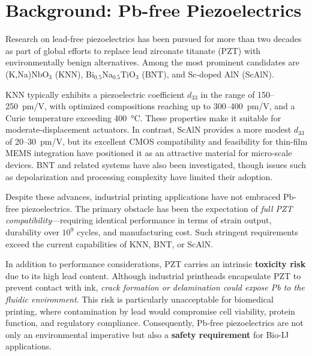 \section{Background: Pb-free Piezoelectrics}
Research on lead-free piezoelectrics has been pursued for more than two
decades as part of global efforts to replace lead zirconate titanate
(PZT) with environmentally benign alternatives.
Among the most prominent candidates are (K,Na)NbO$_3$ (KNN),
Bi$_{0.5}$Na$_{0.5}$TiO$_3$ (BNT), and Sc-doped AlN (ScAlN).

KNN typically exhibits a piezoelectric coefficient $d_{33}$ in the range
of 150--250~pm/V, with optimized compositions reaching up to
300--400~pm/V, and a Curie temperature exceeding 400~\si{\celsius}.
These properties make it suitable for moderate-displacement actuators.
In contrast, ScAlN provides a more modest $d_{33}$ of
20--30~pm/V, but its excellent CMOS compatibility and feasibility for
thin-film MEMS integration have positioned it as an attractive material
for micro-scale devices.
BNT and related systems have also been investigated, though issues such
as depolarization and processing complexity have limited their adoption.

Despite these advances, industrial printing applications have not
embraced Pb-free piezoelectrics.
The primary obstacle has been the expectation of \textit{full PZT
compatibility}---requiring identical performance in terms of strain
output, durability over $10^9$ cycles, and manufacturing cost.
Such stringent requirements exceed the current capabilities of KNN,
BNT, or ScAlN.

In addition to performance considerations, PZT carries an intrinsic
\textbf{toxicity risk} due to its high lead content.
Although industrial printheads encapsulate PZT to prevent contact with
ink, \textit{crack formation or delamination could expose Pb to the
fluidic environment}.
This risk is particularly unacceptable for biomedical printing,
where contamination by lead would compromise cell viability, protein
function, and regulatory compliance.
Consequently, Pb-free piezoelectrics are not only an environmental
imperative but also a \textbf{safety requirement} for Bio-IJ applications.
